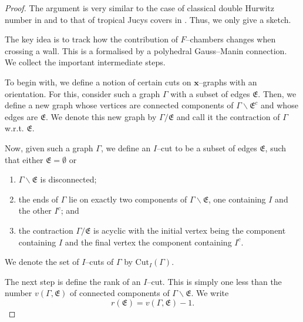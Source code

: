 \documentclass[10pt,a4paper,oneside,no-math,reqno]{amsart}%
\theoremstyle{plain}
\theoremstyle{definition}
\theoremstyle{remark}
\numberwithin{equation}{section}
\newcommand{\1}{\mathds{1}}
\newcommand{\<}{\langle}
\renewcommand{\>}{\rangle}
\begin{document}
\begin{proof}
    The argument is very similar to the case of classical double Hurwitz number in \cite{CJM11} and to that of tropical Jucys covers in \cite[section 4]{HL20}. Thus, we only give a sketch.

    The key idea is to track how the contribution of $F$--chambers changes when crossing a wall. This is a formalised by a polyhedral Gauss--Manin connection. We collect the important intermediate steps.

    To begin with, we define a notion of certain cuts on $\mathbf{x}$--graphs with an orientation. For this, consider such a graph $\Gamma$ with a subset of edges $\mathfrak{E}$. Then, we define a new graph whose vertices are connected components of $\Gamma\backslash\mathfrak{E}^c$ and whose edges are $\mathfrak{E}$. We denote this new graph by $\Gamma/\mathfrak{E}$ and call it the contraction of $\Gamma$ w.r.t. $\mathfrak{E}$.
    
    Now, given such a graph $\Gamma$, we define an $I$--cut to be a subset of edges $\mathfrak{E}$, such that either $\mathfrak{E}=\emptyset$ or
    
    \begin{enumerate}
        \item $\Gamma\backslash \mathfrak{E}$ is disconnected;
        \item the ends of $\Gamma$ lie on exactly two components of $\Gamma\backslash \mathfrak{E}$, one containing $I$ and the other $I^c$; and
        \item the contraction $\Gamma/\mathfrak{E}$ is acyclic with the initial vertex being the component containing $I$ and the final vertex the component containing $I^c$.
    \end{enumerate}

    We denote the set of $I$--cuts of $\Gamma$ by $\mathrm{Cut}_I(\Gamma)$.

    The next step is define the rank of an $I$--cut. This is simply one less than the number $v(\Gamma,\mathfrak{E})$ of connected components of $\Gamma\backslash\mathfrak{E}$. We write
    \begin{equation}
        r(\mathfrak{E})=v(\Gamma,\mathfrak{E})-1.
    \end{equation}


\end{proof}
\end{document}
